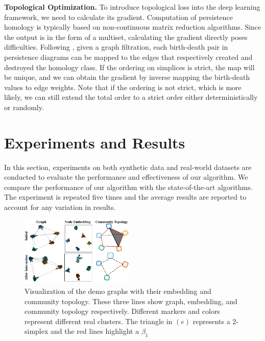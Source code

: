 \documentclass[letterpaper]{article} %
\begin{document}
\noindent\textbf{Topological Optimization.} To introduce topological loss into the deep learning framework, we need to calculate its gradient. Computation of persistence homology is typically based on non-continuous matrix reduction algorithms. Since the output is in the form of a multiset, calculating the gradient directly poses difficulties. Following \cite{gabrielsson2020topology}, given a graph filtration, each birth-death pair in persistence diagrams can be mapped to the edges that respectively created and destroyed the homology class.
If the ordering on simplices is strict, the map will be unique, and we can obtain the gradient by inverse mapping the birth-death values to edge weights. Note that if the ordering is not strict, which is more likely, we can still extend the total order to a strict order either deterministically or randomly. 

\section{Experiments and Results}
In this section, experiments on both synthetic data and real-world datasets are conducted to evaluate the performance and effectiveness of our algorithm. We compare the performance of our algorithm with the state-of-the-art algorithms. The experiment is repeated five times and the average results are reported to account for any variation in results.
\begin{figure}[] %
\centering %
\includegraphics[width=0.48\textwidth]{pic/graph_emb_topo_v3.pdf} %
\caption{Visualization of the demo graphs with their embedding and community topology. These three lines show graph, embedding, and community topology respectively. Different markers and colors represent different real clusters. The triangle in $(e)$ represents a 2-simplex and the red lines highlight a $\beta_1$} %
\label{Fig.graph_emb_topo} %
\end{figure}

\end{document}
